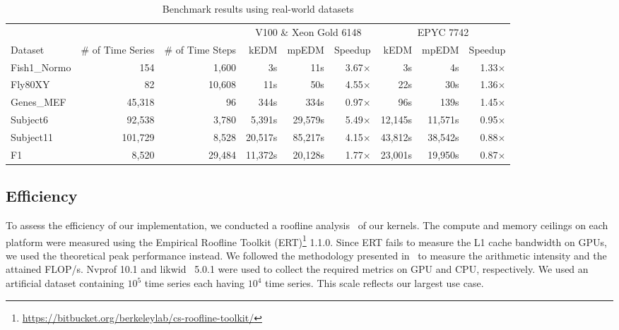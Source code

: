 \documentclass[sigconf]{acmart}
\begin{document}
\begin{table}
\centering
\caption{Benchmark results using real-world datasets}%
\label{tbl:real-world}
\begin{tabular}{@{}lrrrrrrrr@{}}
\toprule
             & \multicolumn{1}{c}{} & \multicolumn{1}{c}{} & \multicolumn{3}{c}{V100 \& Xeon Gold 6148 } & \multicolumn{3}{c}{EPYC 7742} \\ \cmidrule(l){4-6}  \cmidrule(l){7-9}
Dataset      & \multicolumn{1}{c}{\# of Time Series} & \multicolumn{1}{c}{\# of Time Steps} & kEDM & mpEDM & Speedup & kEDM & mpEDM & Speedup \\ \midrule
Fish1\_Normo &  154    & 1,600  &      3s &     11s & 3.67$\times$ &      3s &      4s & 1.33$\times$ \\
Fly80XY      &  82     & 10,608 &     11s &     50s & 4.55$\times$ &     22s &     30s & 1.36$\times$ \\
Genes\_MEF   &  45,318 & 96     &    344s &    334s & 0.97$\times$ &     96s &    139s & 1.45$\times$ \\
Subject6     &  92,538 & 3,780  &  5,391s & 29,579s & 5.49$\times$ & 12,145s & 11,571s & 0.95$\times$ \\
Subject11    & 101,729 & 8,528  & 20,517s & 85,217s & 4.15$\times$ & 43,812s & 38,542s & 0.88$\times$ \\
F1           &  8,520  & 29,484 & 11,372s & 20,128s & 1.77$\times$ & 23,001s & 19,950s & 0.87$\times$ \\ \bottomrule
\end{tabular}
\end{table}

\subsection{Efficiency}

To assess the efficiency of our implementation, we conducted a roofline
analysis~\cite{Williams2008} of our kernels. The compute and memory ceilings
on each platform were measured using the Empirical Roofline Toolkit (ERT)\footnote{\url{https://bitbucket.org/berkeleylab/cs-roofline-toolkit/}} 1.1.0.
Since ERT fails to measure the L1 cache bandwidth on GPUs, we used the
theoretical peak performance instead. We followed the methodology presented
in~\cite{Yang2020a,Yang2020b} to measure the arithmetic intensity and the
attained FLOP/s. Nvprof 10.1 and likwid~\cite{Treibig2010} 5.0.1 were used to
collect the required metrics on GPU and CPU, respectively.
We used an artificial dataset containing $10^5$ time series each having $10^4$
time series. This scale reflects our largest use case.
\end{document}
